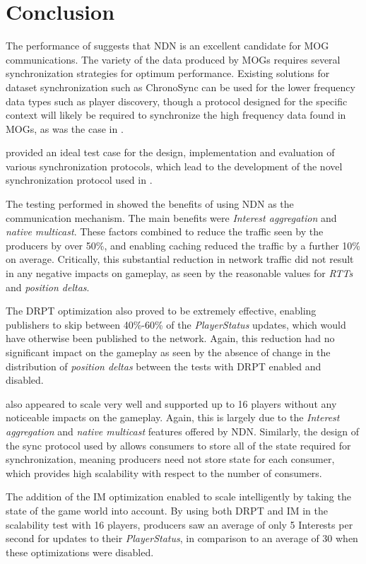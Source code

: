 \section{Conclusion}
The performance of \game{} suggests that NDN is an excellent candidate for MOG communications. The variety of the data produced by MOGs requires several synchronization strategies for optimum performance. Existing solutions for dataset synchronization such as ChronoSync can be used for the lower frequency data types such as player discovery, though a protocol designed for the specific context will likely be required to synchronize the high frequency data found in MOGs, as was the case in \game{}. 

\game{} provided an ideal test case for the design, implementation and evaluation of various synchronization protocols, which lead to the development of the novel synchronization protocol used in \game{}.

The testing performed in  showed the benefits of using NDN as the communication mechanism. The main benefits were \textit{Interest aggregation} and \textit{native multicast}. These factors combined to reduce the traffic seen by the producers by over 50\%, and enabling caching reduced the traffic by a further 10\% on average. Critically, this substantial reduction in network traffic did not result in any negative impacts on gameplay, as seen by the reasonable values for \textit{RTTs} and \textit{position deltas}.

The DRPT optimization also proved to be extremely effective, enabling publishers to skip between 40\%-60\% of the \textit{PlayerStatus} updates, which would have otherwise been published to the network. Again, this reduction had no significant impact on the gameplay as seen by the absence of change in the distribution of \textit{position deltas} between the tests with DRPT enabled and disabled. 

\game{} also appeared to scale very well and supported up to 16 players without any noticeable impacts on the gameplay. Again, this is largely due to the \textit{Interest aggregation} and \textit{native multicast} features offered by NDN. Similarly, the design of the sync protocol used by \game{} allows consumers to store all of the state required for synchronization, meaning producers need not store state for each consumer, which provides high scalability with respect to the number of consumers. 

The addition of the IM optimization enabled \game{} to scale intelligently by taking the state of the game world into account. By using both DRPT and IM in the scalability test with 16 players, producers saw an average of only 5 Interests per second for updates to their \textit{PlayerStatus}, in comparison to an average of 30 when these optimizations were disabled. 


